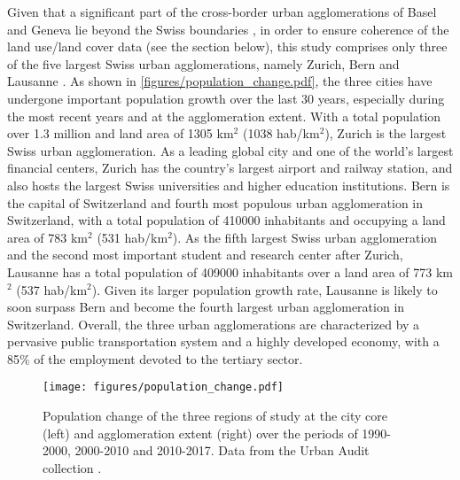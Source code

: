 \documentclass[10pt,letterpaper]{article}
\begin{document}
Given that a significant part of the cross-border urban agglomerations of Basel and Geneva lie beyond the Swiss boundaries \cite{sfso2014espace}, in order to ensure coherence of the land use/land cover data (see the section below), this study comprises only three of the five largest Swiss urban agglomerations, namely Zurich, Bern and Lausanne \cite{sfso2018city}.
As shown in \autoref{figures/population_change.pdf}, the three cities have undergone important population growth over the last 30 years, especially during the most recent years and at the agglomeration extent.
With a total population over 1.3 million and land area of 1305 km$^2$ (1038 hab/km$^2$), Zurich is the largest Swiss urban agglomeration. As a leading global city and one of the world's largest financial centers, Zurich has the country's largest airport and railway station, and also hosts the largest Swiss universities and higher education institutions. 
Bern is the capital of Switzerland and fourth most populous urban agglomeration in Switzerland, with a total population of 410000 inhabitants and occupying a land area of 783 km$^2$ (531 hab/km$^2$). As the fifth largest Swiss urban agglomeration and the second most important student and research center after Zurich, Lausanne has a total population of 409000 inhabitants over a land area of 773 km$^2$ (537 hab/km$^2$). Given its larger population growth rate, Lausanne is likely to soon surpass Bern and become the fourth largest urban agglomeration in Switzerland.
Overall, the three urban agglomerations are characterized by a pervasive public transportation system and a highly developed economy, with a 85\% of the employment devoted to the tertiary sector.

\begin{figure}[!ht]
    \centering  
    \texttt{[image: figures/population\_change.pdf]}
    \vspace{.5em}
    \caption[Population change]{\label{figures/population_change.pdf}Population change of the three regions of study at the city core (left) and agglomeration extent (right) over the periods of 1990-2000, 2000-2010 and 2010-2017. Data from the Urban Audit collection \cite{sfso2018city}.}
\end{figure}
\end{document}
